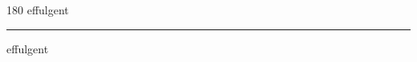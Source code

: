 
\begin{frame}
\begin{center}
\begin{turn}{180}
{\fontsize{2.5cm}{1em}\selectfont effulgent}
\end{turn}
\vspace{1em}\par  
\hrule
\vspace{1em}\par  
{\fontsize{2.5cm}{1em}\selectfont effulgent}
\end{center}
\end{frame}
